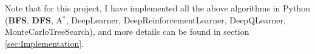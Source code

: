 \noindent Note that for this project, I have implemented all the above algorithms in Python (\textbf{BFS}, \textbf{DFS}, A$^{*}$, DeepLearner, DeepReinforcementLearner, DeepQLearner, MonteCarloTreeSearch), and more details can be found in section \ref{sec:Implementation}.




































